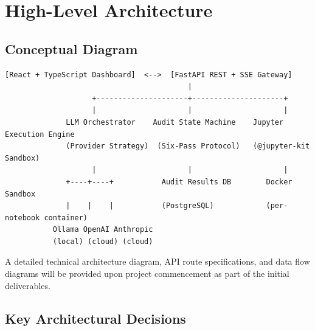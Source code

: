 \documentclass[11pt, a4paper]{article}
\begin{document}
\section{High-Level Architecture}

\subsection*{Conceptual Diagram}

\begin{verbatim}
[React + TypeScript Dashboard]  <-->  [FastAPI REST + SSE Gateway]
                                          |
                    +---------------------+---------------------+
                    |                     |                     |
              LLM Orchestrator    Audit State Machine    Jupyter Execution Engine
              (Provider Strategy)  (Six-Pass Protocol)   (@jupyter-kit Sandbox)
                    |                     |                     |
              +----+----+           Audit Results DB        Docker Sandbox
              |    |    |           (PostgreSQL)            (per-notebook container)
           Ollama OpenAI Anthropic
           (local) (cloud) (cloud)
\end{verbatim}

A detailed technical architecture diagram, API route specifications, and data flow
diagrams will be provided upon project commencement as part of the initial
deliverables.

\subsection*{Key Architectural Decisions}
\end{document}
